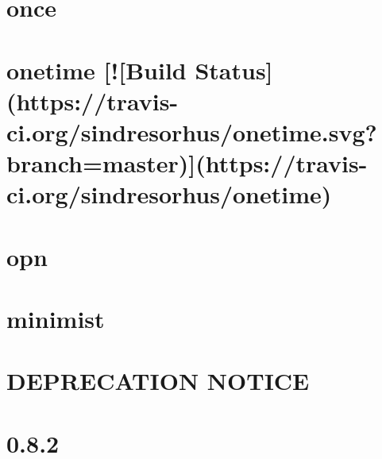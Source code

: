 \documentclass[twoside]{book}
\newcommand{\+}{\discretionary{\mbox{\scriptsize$\hookleftarrow$}}{}{}}
\begin{document}
\chapter{once}
\label{md__c_1_workspace_demo_src_main_script_node_modules_once__r_e_a_d_m_e}

\chapter{onetime \mbox{[}!\mbox{[}Build Status\mbox{]}(https\+://travis-\/ci.org/sindresorhus/onetime.svg?branch=master)\mbox{]}(https\+://travis-\/ci.org/sindresorhus/onetime)}
\label{md__c_1_workspace_demo_src_main_script_node_modules_onetime_readme}

\chapter{opn}
\label{md__c_1_workspace_demo_src_main_script_node_modules_opn_readme}

\chapter{minimist}
\label{md__c_1_workspace_demo_src_main_script_node_modules_optimist_node_modules_minimist_readme}

\chapter{D\+E\+P\+R\+E\+C\+A\+T\+I\+ON N\+O\+T\+I\+CE}
\label{md__c_1_workspace_demo_src_main_script_node_modules_optimist_readme}

\chapter{0.8.2}
\label{md__c_1_workspace_demo_src_main_script_node_modules_optionator__c_h_a_n_g_e_l_o_g}

\end{document}
